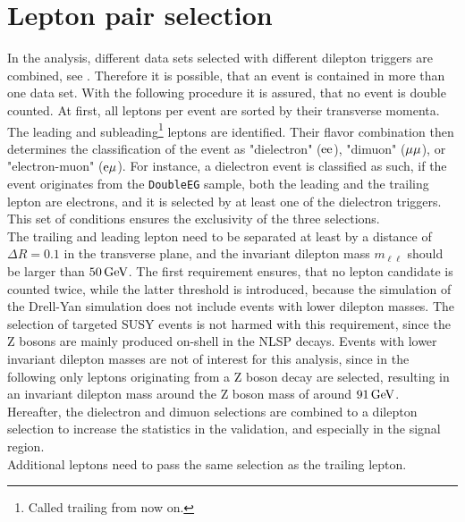 \section{Lepton pair selection}\label{sec:lepPair}
In the analysis, different data sets selected with different dilepton triggers are combined, see . Therefore it is possible, that an event is contained in more than one data set. With the following procedure it is assured, that no event is double counted. At first, all leptons per event are sorted by their transverse momenta. The leading and subleading\footnote{Called trailing from now on.} leptons are identified. Their flavor combination then determines the classification of the event as "dielectron" ($\mathrm{e}\mathrm{e}$), "dimuon" (${\mu}{\mu}$), or "electron-muon" ($\mathrm{e}{\mu}$). For instance, a dielectron event is classified as such, if the event originates from the \texttt{DoubleEG} sample, both the leading and the trailing lepton are electrons, and it is selected by at least one of the dielectron triggers. This set of conditions ensures the exclusivity of the three selections.\\
The trailing and leading lepton need to be separated at least by a distance of $\Delta R=0.1$ in the transverse plane, and the invariant dilepton mass $m_{\ell\ell}$ should be larger than $50\,\text{Ge\hspace{-.08em}V}$. The first requirement ensures, that no lepton candidate is counted twice, while the latter threshold is introduced, because the simulation of the Drell-Yan simulation does not include events with lower dilepton masses. The selection of targeted SUSY events is not harmed with this requirement, since the Z bosons are mainly produced on-shell in the NLSP decays. Events with lower invariant dilepton masses are not of interest for this analysis, since in the following only leptons originating from a Z boson decay are selected, resulting in an invariant dilepton mass around the Z boson mass of around $91\,\text{Ge\hspace{-.08em}V}$.\\
Hereafter, the dielectron and dimuon selections are combined to a dilepton selection to increase the statistics in the validation, and especially in the signal region.\\
Additional leptons need to pass the same selection as the trailing lepton.



